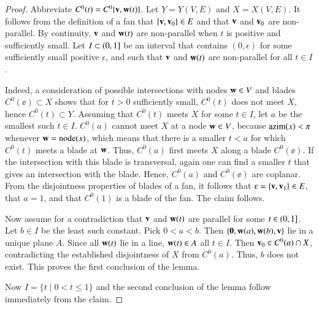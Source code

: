 \begin{proof}
Abbreviate $C^0(t) = C^0\{{\mathbf v},{\mathbf w}(t)\}$.
Let $Y = Y(V,E)$ and $X = X(V,E)$.
It follows from the definition of a fan that $\{{\mathbf v},{\mathbf v}_0\}\in E$ and
that ${\mathbf v}$ and ${\mathbf v}_0$ are non-parallel.  By continuity, ${\mathbf v}$ and ${\mathbf w}(t)$
are non-parallel when $t$ is positive and sufficiently small.  
Let $I\subset(0,1]$ be an interval that contains
$(0,\epsilon)$ for some sufficiently small positive $\epsilon$, and
such that ${\mathbf v}$ and ${\mathbf w}(t)$ are non-parallel for all $t\in I$.

  Indeed, a consideration of possible
intersections with nodes ${\mathbf w}\in V$ and blades $C^0(\ee)\subset X$
shows that for $t>0$ sufficiently small, $C^0(t)$ does not meet $X$,
hence $C^0(t)\subset Y$.  Assuming that $C^0(t)$ meets $X$ for some
$t\in I$, let $a$ be the smallest such $t\in I$.  $C^0(a)$ cannot meet
$X$ at a node ${\mathbf w}\in V$, because ${\operatorname{azim}}(x)<\pi$ whenever
${\mathbf w}={\operatorname{node}}(x)$, which means that
there is a smaller $t<a$ for which $C^0(t)$ meets a blade at ${\mathbf w}$.
Thus, $C^0(a)$ first meets $X$ along a blade $C^0(\ee)$. If the
intersection with this blade is transversal, again one can find a
smaller $t$ that gives an intersection with the blade.  Hence,
$C^0(a)$ and $C^0(\ee)$ are coplanar.  From the disjointness
properties of blades of a fan, it follows that $\ee = \{\v,\v_1\}\in
E$, that $a=1$, and that $C^0(1)$ is a blade of the fan.  The claim
follows.

Now assume for a contradiction that ${\mathbf v}$ and ${\mathbf w}(t)$ are parallel for
some $t\in(0,1]$.  Let $b\in I$ be the least such
constant.  Pick $0<a<b$.  Then $\{{\mathbf 0},{\mathbf w}(a),{\mathbf w}(b),{\mathbf v}\}$ lie in a
unique plane $A$.  Since all ${\mathbf w}(t)$ lie in a line, ${\mathbf w}(t)\in A$ all
$t\in I$.  Then ${\mathbf v}_0\in C^0(a)\cap X$, contradicting the established
disjointness of $X$ from $C^0(a)$.  Thus, $b$ does not exist.  This
proves the first conclusion of the lemma.

Now $I= \{t\mid 0 < t \le 1\}$ and the second conclusion of the lemma
follow immediately from the claim.
\end{proof}

